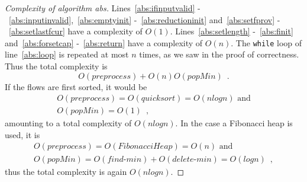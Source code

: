 \begin{proof}[Complexity of algorithm abs]
  Lines~\ref{abs:ifinputvalid} -~\ref{abs:inputinvalid},~\ref{abs:emptyinit} -~\ref{abs:reductioninit} and~\ref{abs:setfprov}
  -~\ref{abs:setlastfcur} have a complexity of $O\left(1\right)$. Lines~\ref{abs:setlength} -~\ref{abs:finit}
  and~\ref{abs:forsetcap} -~\ref{abs:return} have a complexity of $O\left(n\right)$. The \texttt{while} loop of
  line~\ref{abs:loop} is repeated at most $n$ times, as we saw in the proof of correctness. Thus the total complexity is
  \begin{equation*}
    O\left(preprocess\right) + O\left(n\right)O\left(popMin\right) \enspace.
  \end{equation*}
  If the flows are first sorted, it would be
  \begin{equation*}
  \begin{gathered}
    O\left(preprocess\right) = O\left(quicksort\right) = O\left(nlogn\right) \mbox{ and} \\
    O\left(popMin\right) = O\left(1\right) \enspace,
  \end{gathered}
  \end{equation*}
  amounting to a total complexity of $O\left(nlogn\right)$. In the case a Fibonacci heap is used, it is
  \begin{equation*}
  \begin{gathered}
    O\left(preprocess\right) = O\left(FibonacciHeap\right) = O\left(n\right) \mbox{ and} \\
    O\left(popMin\right) = O\left(find\mbox{-}min\right) + O\left(delete\mbox{-}min\right) = O\left(logn\right) \enspace,
  \end{gathered}
  \end{equation*}
  thus the total complexity is again $O\left(nlogn\right)$.
\end{proof}
